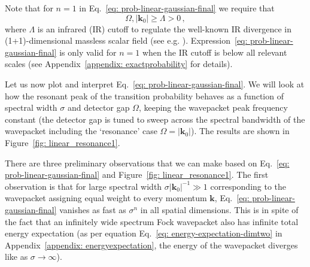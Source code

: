\documentclass[11pt,prd,onecolumn,superscriptaddress,nofootinbib,floatfix,amsmath,amssymb]{revtex4-2}
\newcommand{\bk}{{\bm{k}}}
\begin{document}
    Note that for $n=1$ in Eq.~\eqref{eq: prob-linear-gaussian-final} we require that
    \begin{equation}
        \Omega,|\bk_0| \geq \Lambda > 0\,,
        \label{eq: IR-cutoff}
    \end{equation}
    where $\Lambda$ is an infrared (IR) cutoff to regulate the well-known IR divergence in (1+1)-dimensional massless scalar field (see e.g. \cite{birrell1984quantum,pozas2015harvesting}). Expression~\eqref{eq: prob-linear-gaussian-final}  is only valid for $n=1$  when the IR cutoff is below all relevant scales (see Appendix~\ref{appendix: exactprobability} for details). 
    
    	
    Let us now plot and interpret Eq.~\eqref{eq: prob-linear-gaussian-final}. We will look at how the resonant peak of the transition probability behaves as a function of spectral width $\sigma$ and detector gap $\Omega$, keeping the wavepacket peak frequency constant (the detector gap is tuned to sweep across the spectral bandwidth of the wavepacket including the `resonance' case $\Omega=|\bk_0|$). The results are shown in Figure~\ref{fig: linear_resonance1}.
    
 
    	
    There are three preliminary observations that we can make based on Eq.~\eqref{eq: prob-linear-gaussian-final} and Figure~\ref{fig: linear_resonance1}. The first observation is that for large spectral width $\sigma|\bk_0|^{-1}\gg 1$ corresponding to the wavepacket assigning equal weight to every momentum $\bk$, Eq.~\eqref{eq: prob-linear-gaussian-final} vanishes as fast as $\sigma^n$ in all spatial dimensions. This is in spite of the fact that an infinitely wide spectrum Fock wavepacket also has infinite total energy expectation (as per equation Eq.~\eqref{eq: energy-expectation-dimtwo} in Appendix~\ref{appendix: energyexpectation}, the energy of the wavepacket diverges like as $\sigma\rightarrow\infty$). %
    
\end{document}
